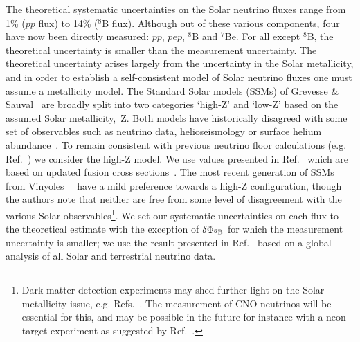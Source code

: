 The theoretical systematic uncertainties on the Solar neutrino fluxes range from 1\% ($pp$ flux) to 14\% ($^8$B flux). Although out of these various components, four have now been directly measured: $pp$, $pep$, $^8$B and $^7$Be. For all except $^8$B, the theoretical uncertainty is smaller than the measurement uncertainty. The theoretical uncertainty arises largely from the uncertainty in the Solar metallicity, and in order to establish a self-consistent model of Solar neutrino fluxes one must assume a metallicity model. The Standard Solar models (SSMs) of Grevesse \& Sauval~\cite{Grevesse:1998bj} are broadly split into two categories `high-Z' and `low-Z' based on the assumed Solar metallicity,~Z. Both models have historically disagreed with some set of observables such as neutrino data, helioseismology or surface helium abundance~\cite{Villante:2013mba}. To remain consistent with previous neutrino floor calculations (e.g. Ref.~\cite{Ruppin:2014bra}) we consider the high-Z model. We use values presented in Ref.~\cite{Serenelli:2011py} which are based on updated fusion cross sections~\cite{Adelberger:2010qa}. The most recent generation of SSMs from Vinyoles~\etal~\cite{Vinyoles:2016djt} have a mild preference towards a high-Z configuration, though the authors note that neither are free from some level of disagreement with the various Solar observables\footnote{Dark matter detection experiments may shed further light on the Solar metallicity issue, e.g. Refs.~\cite{Billard:2014yka,Strigari:2016ztv,Cerdeno:2016sfi}. The measurement of CNO neutrinos will be essential for this, and may be possible in the future for instance with a neon target experiment as suggested by Ref.~\cite{Cerdeno:2016sfi}.}. We set our systematic uncertainties on each flux to the theoretical estimate with the exception of $\delta \Phi_{^8{\rm B}}$ for which the measurement uncertainty is smaller; we use the result presented in Ref.~\cite{Bergstrom:2016cbh} based on a global analysis of all Solar and terrestrial neutrino data. 

